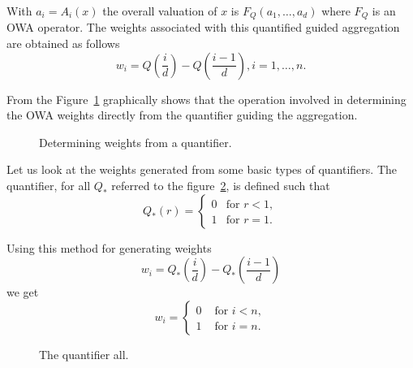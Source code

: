 With $a_i = A_i(x)$ the overall valuation of $x$ is $F_Q(a_1,\dots,a_d)$ where $F_Q$ is an OWA operator. The weights associated with this quantified guided aggregation are obtained as follows 
\begin{equation}
\label{equa:owa5}
w_i = Q(\frac{i}{d}) - Q(\frac{i-1}{d}) , i = 1,\dots,n.
\end{equation}

From the Figure~\ref{pig:owa7} graphically shows that the operation involved in determining the OWA weights directly from the quantifier guiding the aggregation.
\begin{figure}[h]
\vspace{.2in}
\caption{Determining weights from a quantifier.}
\label{pig:owa7}
\end{figure}

Let us look at the weights generated from some basic types of quantifiers. The quantifier, for all $Q_{\ast}$ referred to the figure~\ref{pig:owa8}, is defined such that
\[Q_{\ast}(r) = \left\{
\begin{matrix}
0 & \text{for } r<1,\\
1 & \text{for } r=1.
\end{matrix}\right.\]

Using this method for generating weights
\[w_i = Q_{\ast}(\frac{i}{d})-Q_{\ast}(\frac{i-1}{d})\]
we get 
\[w_i = \left\{
\begin{matrix}
0 & \text{  for  } i<n, \\
1 & \text{  for  } i=n.
\end{matrix}
\right.\]
\begin{figure}[h]
\vspace{.2in}
\caption{The quantifier all.}
\label{pig:owa8}
\end{figure}

